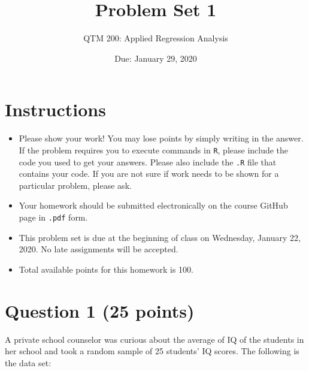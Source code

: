 \documentclass[12pt,letterpaper]{article}
\title{Problem Set 1}
\date{Due: January 29, 2020}
\author{QTM 200: Applied Regression Analysis}
\begin{document}
	\maketitle
	
	\section*{Instructions}
	\begin{itemize}
		\item Please show your work! You may lose points by simply writing in the answer. If the problem requires you to execute commands in \texttt{R}, please include the code you used to get your answers. Please also include the \texttt{.R} file that contains your code. If you are not sure if work needs to be shown for a particular problem, please ask.
		\item Your homework should be submitted electronically on the course GitHub page in \texttt{.pdf} form.
		\item This problem set is due at the beginning of class on Wednesday, January 22, 2020. No late assignments will be accepted.
		\item Total available points for this homework is 100.
	\end{itemize}
	
	\vspace{1cm}
	\section*{Question 1 (25 points)}

A private school counselor was curious about the average of IQ of the students in her school and took a random sample of 25 students' IQ scores. The following is the data set:
\vspace{.5cm}

 
\end{document}
